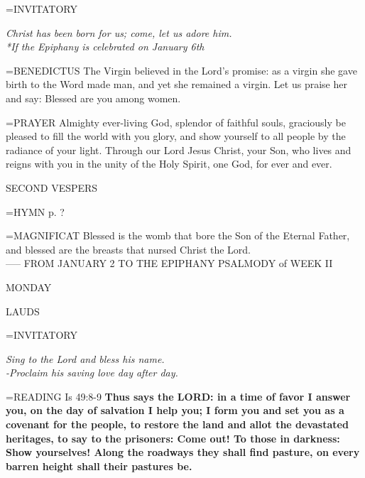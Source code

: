 \hangindent=\parindent \small{INVITATORY}
\begin{center}
\textit{Christ has been born for us; come, let us adore him.\\}
\textit{*If the Epiphany is celebrated on January 6th\\}
\end{center}

\hangindent=\parindent \small{BENEDICTUS 	The Virgin believed in the Lord's promise: as a virgin she gave birth to the Word made man, and yet she remained a virgin. Let us praise her and say: Blessed are you among women.\\}

\hangindent=\parindent \small{PRAYER 	Almighty ever-living God, splendor of faithful souls, graciously be pleased to fill the world with you glory, and show yourself to all people by the radiance of your light. Through our Lord Jesus Christ, your Son, who lives and reigns with you in the unity of the Holy Spirit, one God, for ever and ever.}

\begin{flushleft}\normalsize SECOND VESPERS\\\end{flushleft}
\hangindent=\parindent \small{\uppercase{HYMN} p.  ?\\}

\hangindent=\parindent \small{MAGNIFICAT 	Blessed is the womb that bore the Son of the Eternal Father, and blessed are the breasts that nursed Christ the Lord.\\}
-----
FROM JANUARY 2 TO THE EPIPHANY
PSALMODY of WEEK II

\begin{center}
\normalsize MONDAY
\end{center}

\begin{flushleft}\normalsize LAUDS\\\end{flushleft}
\hangindent=\parindent \small{INVITATORY}
\begin{center}
\textit{Sing to the Lord and bless his name.\\}
\textit{-Proclaim his saving love day after day.\\}
\end{center}

\hangindent=\parindent \small{READING}    Is 49:8-9 \textbf{   Thus says the LORD: in a time of favor I answer you, on the day of salvation I help you; I form you and set you as a covenant for the people, to restore the land and allot the devastated heritages, to say to the prisoners: Come out! To those in darkness: Show yourselves! Along the roadways they shall find pasture, on every barren height shall their pastures be.\\}

